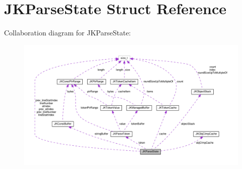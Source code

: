 \hypertarget{structJKParseState}{}\section{J\+K\+Parse\+State Struct Reference}
\label{structJKParseState}


Collaboration diagram for J\+K\+Parse\+State\+:
\nopagebreak
\begin{figure}[H]
\begin{center}
\leavevmode
\includegraphics[width=350pt]{structJKParseState__coll__graph}
\end{center}
\end{figure}
